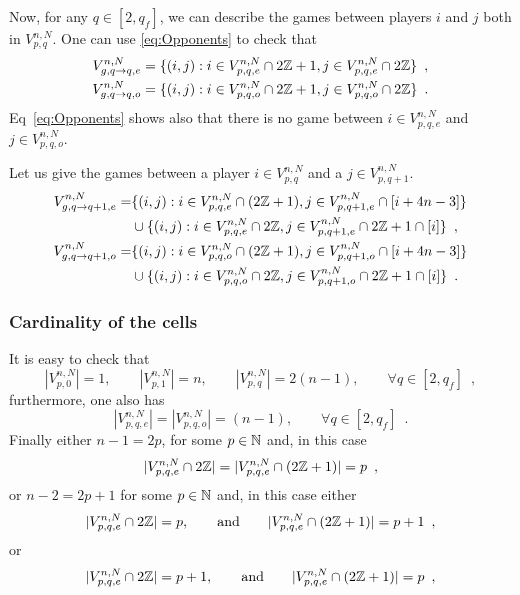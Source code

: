 Now, for any $q\in [2,q_f]$, we can describe the games between players $i$ and $j$ both in $V_{p,q}^{n,N}$. One can use \eqref{eq:Opponents} to check that
\begin{align}
 \notag V_{g,q\to q,e}^{n,N}&=\{(i,j) : i\in V_{p,q,e}^{n,N}\cap 2\mathbb{Z}+1, j\in V_{p,q,e}^{n,N}\cap 2\mathbb{Z}\}\enspace,\\
\label{Def:Vqtoq}  V_{g,q\to q,o}^{n,N}&=\{(i,j) : i\in V_{p,q,o}^{n,N}\cap 2\mathbb{Z}+1, j\in V_{p,q,o}^{n,N}\cap 2\mathbb{Z}\}\enspace.
\end{align}
Eq~\eqref{eq:Opponents} shows also that there is no game between $i\in V_{p, q,e}^{n,N}$ and $j\in V_{p,q,o}^{n,N}$. 

Let us give the games between a player $i\in V_{p,q}^{n,N}$ and a $j\in V_{p,q+1}^{n,N}$.
\begin{align*}
V_{g,q\to q+1,e}^{n,N}=&\{(i,j) : i\in V_{p,q,e}^{n,N}\cap(2\mathbb{Z}+1),j\in V_{p,q+1,e}^{n,N}\cap [i+4n-3]\}\\
&\cup\{(i,j) : i\in V_{p,q,e}^{n,N}\cap 2\mathbb{Z},j\in V_{p,q+1,e}^{n,N}\cap 2\mathbb{Z}+1\cap [i]\}\enspace,\\
V_{g,q\to q+1,o}^{n,N}=&\{(i,j) : i\in V_{p,q,o}^{n,N}\cap(2\mathbb{Z}+1),j\in V_{p,q+1,o}^{n,N}\cap [i+4n-3]\}\\
&\cup\{(i,j) : i\in V_{p,q,o}^{n,N}\cap 2\mathbb{Z},j\in V_{p,q+1,o}^{n,N}\cap 2\mathbb{Z}+1\cap [i]\}\enspace.
\end{align*}

\subsubsection{Cardinality of the cells}
It is easy to check that 
\[
|V_{p,0}^{n,N}|=1, \qquad |V_{p,1}^{n,N}|=n,\qquad |V_{p,q}^{n,N}|=2(n-1),\qquad\forall q\in[2,q_f]\enspace,
\]
furthermore, one also has
\[
|V_{p,q,e}^{n,N}|=|V_{p,q,o}^{n,N}|=(n-1),\qquad \forall q\in [2,q_f]\enspace.
\]
Finally either $n-1=2p$, for some $p\in \mathbb{N}$ and, in this case 
\[
|V_{p,q,e}^{n,N}\cap 2\mathbb{Z}|=|V_{p,q,e}^{n,N}\cap (2\mathbb{Z}+1)|=p\enspace,
\]
or $n-2=2p+1$ for some $p\in \mathbb{N}$ and, in this case either 
\[
|V_{p,q,e}^{n,N}\cap 2\mathbb{Z}|=p,\qquad\text{and}\qquad |V_{p,q,e}^{n,N}\cap (2\mathbb{Z}+1)|=p+1\enspace,
\]
or 
\[
|V_{p,q,e}^{n,N}\cap 2\mathbb{Z}|=p+1,\qquad\text{and}\qquad |V_{p,q,e}^{n,N}\cap (2\mathbb{Z}+1)|=p\enspace,
\]

